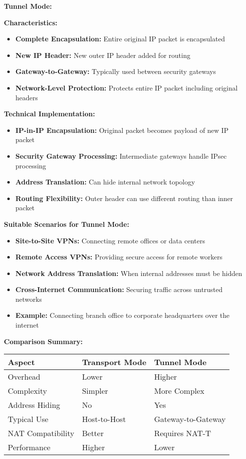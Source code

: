 \documentclass[12pt,a4paper]{article}
\begin{document}
\textbf{Tunnel Mode:}

\textbf{Characteristics:}
\begin{itemize}
    \item \textbf{Complete Encapsulation:} Entire original IP packet is encapsulated
    \item \textbf{New IP Header:} New outer IP header added for routing
    \item \textbf{Gateway-to-Gateway:} Typically used between security gateways
    \item \textbf{Network-Level Protection:} Protects entire IP packet including original headers
\end{itemize}

\textbf{Technical Implementation:}
\begin{itemize}
    \item \textbf{IP-in-IP Encapsulation:} Original packet becomes payload of new IP packet
    \item \textbf{Security Gateway Processing:} Intermediate gateways handle IPsec processing
    \item \textbf{Address Translation:} Can hide internal network topology
    \item \textbf{Routing Flexibility:} Outer header can use different routing than inner packet
\end{itemize}

\textbf{Suitable Scenarios for Tunnel Mode:}
\begin{itemize}
    \item \textbf{Site-to-Site VPNs:} Connecting remote offices or data centers
    \item \textbf{Remote Access VPNs:} Providing secure access for remote workers
    \item \textbf{Network Address Translation:} When internal addresses must be hidden
    \item \textbf{Cross-Internet Communication:} Securing traffic across untrusted networks
    \item \textbf{Example:} Connecting branch office to corporate headquarters over the internet
\end{itemize}

\textbf{Comparison Summary:}

\begin{center}
\begin{tabular}{|l|l|l|}
\hline
\textbf{Aspect} & \textbf{Transport Mode} & \textbf{Tunnel Mode} \\
\hline
Overhead & Lower & Higher \\
\hline
Complexity & Simpler & More Complex \\
\hline
Address Hiding & No & Yes \\
\hline
Typical Use & Host-to-Host & Gateway-to-Gateway \\
\hline
NAT Compatibility & Better & Requires NAT-T \\
\hline
Performance & Higher & Lower \\
\hline
\end{tabular}
\end{center}
\end{document}
